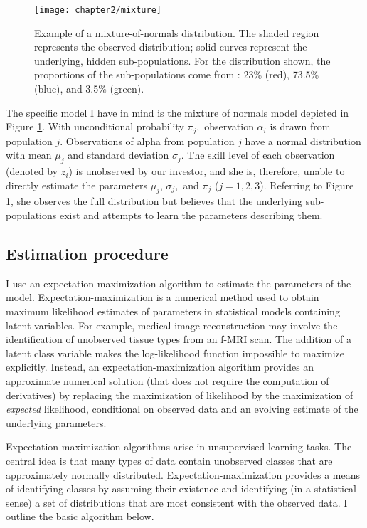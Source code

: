 		\begin{figure}[t]
			\small
			\centering
			\texttt{[image: chapter2/mixture]}
			\captionsetup{skip=-20pt, font=footnotesize, justification=justified, width=\textwidth}
			\caption[Example of a mixture-of-normals distribution]{Example of a mixture-of-normals distribution. The shaded region represents the observed distribution; solid curves represent the underlying, hidden sub-populations. For the distribution shown, the proportions of the sub-populations come from \citet{Barras2010}: 23\% (red), 73.5\% (blue), and 3.5\% (green).}
			\label{fig:mixture}
		\end{figure}

		The specific model I have in mind is the mixture of normals model depicted in Figure \ref{fig:mixture}. With unconditional probability $\pi_j,$ observation $\alpha_i$ is drawn from population $j$. Observations of alpha from population $j$ have a normal distribution with mean $\mu_j$ and standard deviation $\sigma_j$. The skill level of each observation (denoted by $z_i$) is unobserved by our investor, and she is, therefore, unable to directly estimate the parameters $\mu_j$, $\sigma_j,$ and $\pi_j$ ($j=1,2,3$). Referring to Figure \ref{fig:mixture}, she observes the full distribution but believes that the underlying sub-populations exist and attempts to learn the parameters describing them.

	\subsection{Estimation procedure}
		I use an expectation-maximization algorithm to estimate the parameters of the model. Expectation-maximization is a numerical method used to obtain maximum likelihood estimates of parameters in statistical models containing latent variables. For example, medical image reconstruction may involve the identification of unobserved tissue types from an f-MRI scan.  The addition of a latent class variable makes the log-likelihood function impossible to maximize explicitly.  Instead, an expectation-maximization algorithm provides an approximate numerical solution (that does not require the computation of derivatives) by replacing the maximization of likelihood by the maximization of \textit{expected} likelihood, conditional on observed data and an evolving estimate of the underlying parameters.

		Expectation-maximization algorithms arise in unsupervised learning tasks.  The central idea is that many types of data contain unobserved classes that are approximately normally distributed.  Expectation-maximization provides a means of identifying classes by assuming their existence and identifying (in a statistical sense) a set of distributions that are most consistent with the observed data. I outline the basic algorithm below.

